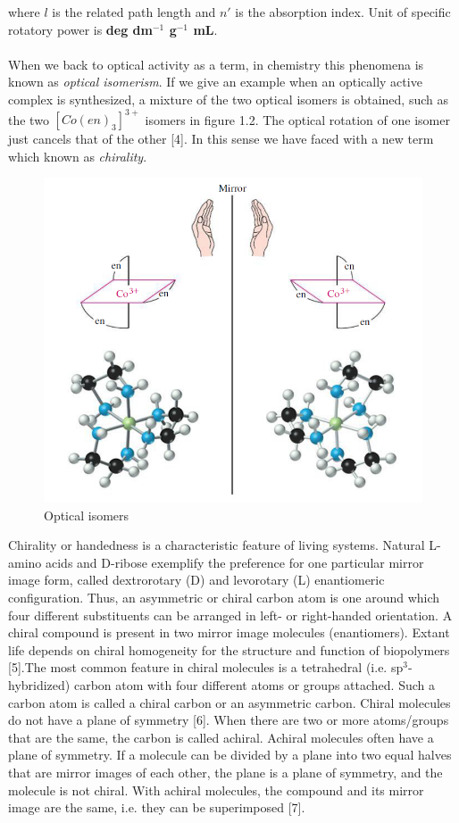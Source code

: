 \documentclass[a4paper,12pt]{report}
\begin{document}
where $l$ is the related path length and $n'$ is the absorption index. Unit of specific rotatory power is \textbf{deg dm$^{-1}$ g$^{-1}$ mL}.\\\\
When we back to optical activity as a term, in chemistry this phenomena is known as \textit{optical isomerism}. If we give an example when an optically active complex is synthesized, a mixture of the two
optical isomers is obtained, such as the two $[Co(en)_{3}]^{3+}$ isomers in figure 1.2. The optical rotation of one isomer just cancels that of
the other [4]. In this sense we have faced with a new term which known as \textit{chirality}.    
\begin{figure}[h]
\centering
\includegraphics[width=0.50\linewidth, height=0.25\textheight]{isomerism}
\caption{Optical isomers}
\label{fig:isomerism}
\end{figure}
Chirality or handedness is a characteristic feature of living systems. Natural L-amino
acids and D-ribose exemplify the preference for one particular mirror image form,
called dextrorotary (D) and levorotary (L) enantiomeric configuration. Thus, an
asymmetric or chiral carbon atom is one around which four different substituents
can be arranged in left- or right-handed orientation. A chiral compound is present in
two mirror image molecules (enantiomers). Extant life depends on chiral homogeneity
for the structure and function of biopolymers [5].The most common feature in chiral molecules is a tetrahedral (i.e. sp$^{3}$-
hybridized) carbon atom with four different atoms or groups attached. Such
a carbon atom is called a chiral carbon or an asymmetric carbon. Chiral
molecules do not have a plane of symmetry [6]. When there are two or more atoms/groups that are the same, the carbon is
called achiral. Achiral molecules often have a plane of symmetry. If a
molecule can be divided by a plane into two equal halves that are mirror
images of each other, the plane is a plane of symmetry, and the molecule is not chiral. With achiral molecules, the compound and its mirror image are the same, i.e. they can be superimposed [7]. 
\end{document}
